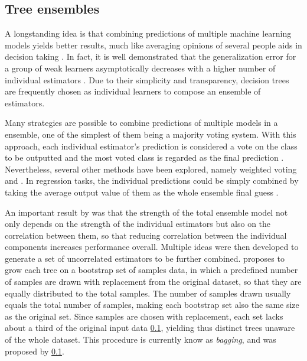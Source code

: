 %


\subsection{Tree ensembles}

A longstanding idea is that combining predictions of multiple machine learning models yields better results, much like averaging opinions of several people aids in decision taking \cite{}. In fact, it is well demonstrated that the generalization error for a group of weak learners asymptotically decreases with a higher number of individual estimators \cite{}. Due to their simplicity and transparency, decision trees are frequently chosen as individual learners to compose an ensemble of estimators.

Many strategies are possible to combine predictions of multiple models in a ensemble, one of the simplest of them being a majority voting system. With this approach, each individual estimator's prediction is considered a vote on the class to be outputted and the most voted class is regarded as the final prediction \cite{}. Nevertheless, several other methods have been explored, namely weighted voting \cite{} and {} \cite{Fawagreh_2014}. In regression tasks, the individual predictions could be simply combined by taking the average output value of them as the whole ensemble final guess \cite{}.


An important result by \cite{Breiman_2001} was that the strength of the total ensemble model not only depends on the strength of the individual estimators but also on the correlation between them, so that reducing correlation between the individual components increases performance overall. Multiple ideas were then developed to generate a set of uncorrelated estimators to be further combined. \cite{} proposes to grow each tree on a bootstrap set of samples data, in which a predefined number of samples are drawn with replacement from the original dataset, so that they are equally distributed to the total samples. The number of samples drawn usually equals the total number of samples, making each bootstrap set also the same size as the original set. Since samples are chosen with replacement, each set lacks about a third of the original input data \ref{}, yielding thus distinct trees unaware of the whole dataset. This procedure is currently know as \emph{bagging}, and was proposed by \ref{}.

